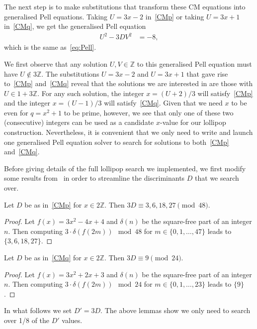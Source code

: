 \documentclass[version=preprint]{iacrcc}
\newcommand{\Z}{\mathbb{Z}}
\begin{document}
The next step is to make substitutions that transform these CM equations into generalised Pell equations. Taking $U=3x-2$ in~\eqref{CMp} or taking $U=3x+1$ in~\eqref{CMq}, we get the generalised Pell equation
\begin{align*}
U^2-3DV^2 &= -8, 
\end{align*}
which is the same as~\eqref{eq:Pell}. 

We first observe that any solution $U, V \in \Z$ to this generalised Pell equation must have $U \not\in 3\Z$. The substitutions $U=3x-2$ and $U=3x+1$ that gave rise to~\eqref{CMp} and~\eqref{CMq} reveal that the solutions we are interested in are those with $U \in 1 + 3\Z$. For any such solution, the integer $x=(U+2)/3$ will satisfy~\eqref{CMp} and the integer $x=(U-1)/3$ will satisfy~\eqref{CMq}. Given that we need $x$ to be even for $q=x^2+1$ to be prime, however, we see that only one of these two (consecutive) integers can be used as a candidate $x$-value for our lollipop construction. Nevertheless, it is convenient that we only need to write and launch one generalised Pell equation solver to search for solutions to both~\eqref{CMp} and~\eqref{CMq}. 

Before giving details of the full lollipop search we implemented, we first modify some results from~\cite{DBLP:conf/ants/KarabinaT08} in order to streamline the discriminants $D$ that we search over. 

\begin{lemma}\label{FqStickEp}
	Let $D$ be as in~\eqref{CMp} for $x\in 2\Z$. Then $3D\equiv 3,6,18,27 \pmod {48}$.
\end{lemma}
\begin{proof}
	Let $f(x) = 3x^2 - 4x + 4$ and $\delta(n)$ be the square-free part of an integer $n$. Then computing $3\cdot \delta(f(2m)) \mod {48}$ for $m\in \{0,1,\ldots,47\}$ leads to $\{3,6,18,27\}$.  
\end{proof}

\begin{lemma}\label{FpStickEq}
	Let $D$ be as in~\eqref{CMq} for $x\in 2\Z$. Then $3D\equiv 9 \pmod {24}$. 
\end{lemma}
\begin{proof}
	Let $f(x) = 3x^2 + 2x + 3$ and $\delta(n)$ be the square-free part of an integer $n$. Then computing $3\cdot\delta(f(2m)) \mod {24}$ for $m\in \{0,1,\ldots,23\}$ leads to $\{9\}$.  
\end{proof}


In what follows we set $D'=3D$. The above lemmas show we only need to search over 1/8 of the $D'$ values. 
\end{document}
